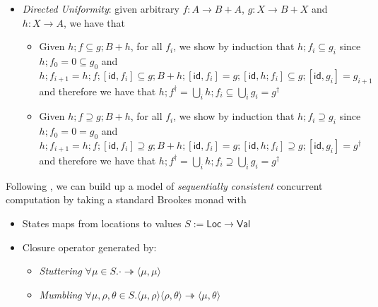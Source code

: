 \documentclass[acmsmall,screen,anonymous,review]{acmart}
\newcommand{\ms}[1]{\ensuremath{\mathsf{#1}}}
\newcommand{\nats}{\mathbb{N}}
\newcommand{\tref}{\twoheadrightarrow}
\begin{document}
\begin{itemize}
\begin{align*}
    = f ; [[\ms{id}, g^\dagger], f_j ; [\ms{id}, g^\dagger]]
    \subseteq f ;  [[\ms{id}, g^\dagger], g^\dagger] = g^\dagger
  \end{align*}
  We now show by induction that $h_i \subseteq g^\dagger$: noting that $h_0 = 0
  \subseteq g^\dagger$, it suffices to show that
  \begin{align*}
  h_{i + 1} 
  & = f ; [[\ms{id}, h_i], f^\dagger ; [\ms{id}, h_i]] 
    \subseteq f ; [[\ms{id}, g^\dagger], f_j ; [\ms{id}, g^\dagger]] \\
  & = \bigcup_{j \in \nats}(f ; [[\ms{id}, g^\dagger], f_j ; [\ms{id}, g^\dagger]])
    \subseteq \bigcup_{j \in \nats}(f ; [[\ms{id}, g^\dagger], g^\dagger]])
    = g^\dagger
  \end{align*}
  It follows that $h^\dagger \subseteq g^\dagger$ and hence that $h^\dagger = g^\dagger$, as
  desired.
  \item \emph{Directed Uniformity}: given arbitrary $f : A \to B + A$, $g : X \to B + X$ and $h : X
  \to A$, we have that
  \begin{itemize}
    \item Given $h ; f \subseteq g ; B + h$, for all $f_i$, we show by induction that 
    $h ; f_i \subseteq g_i$ since $h ; f_0 = 0 \subseteq g_0$ and
    \begin{equation*}
    h ; f_{i + 1} = h ; f ; [\ms{id}, f_i] 
    \subseteq g ; B + h ; [\ms{id}, f_i]
    = g ; [\ms{id}, h ; f_i] \subseteq g ; [\ms{id}, g_i] = g_{i + 1}
    \end{equation*}
    and therefore we have that $h ; f^\dagger = \bigcup_i h ; f_i \subseteq \bigcup_i g_i =
    g^\dagger$
    \item Given $h ; f \supseteq g ; B + h$, for all $f_i$, we show by induction that 
    $h ; f_i \supseteq g_i$ since $h ; f_0 = 0 = g_0$ and
    \begin{equation*}
    h ; f_{i + 1} = h ; f ; [\ms{id}, f_i] 
    \supseteq g ; B + h ; [\ms{id}, f_i]
    = g ; [\ms{id}, h ; f_i] \supseteq g ; [\ms{id}, g_i] = g^\dagger
    \end{equation*}
    and therefore we have that $h ; f^\dagger = \bigcup_i h ; f_i \supseteq \bigcup_i g_i =
    g^\dagger$
  \end{itemize}
\end{itemize}
Following \citet{brookes-full-abstraction-96}, we can build up a model of \emph{sequentially
consistent} concurrent computation by taking a standard Brookes monad with
\begin{itemize}
  \item States maps from locations to values $S := \ms{Loc} \to \ms{Val}$
  \item Closure operator generated by:
  \begin{itemize}
    \item \emph{Stuttering} $\forall \mu \in S . \cdot \tref \langle \mu, \mu \rangle$
    \item \emph{Mumbling} $\forall \mu, \rho, \theta \in S . 
      \langle \mu, \rho \rangle \langle \rho, \theta \rangle \tref \langle \mu, \theta \rangle$
  \end{itemize}
\end{itemize} 
\end{document}

